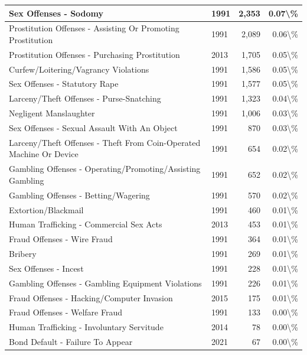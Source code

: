 \documentclass[
]{krantz}
\begin{document}
\begin{longtable}[t]{l|l|r|r}
\hline
Sex Offenses - Sodomy & 1991 & 2,353 & 0.07\textbackslash{}\%\\
\hline
Prostitution Offenses - Assisting Or Promoting Prostitution & 1991 & 2,089 & 0.06\textbackslash{}\%\\
\hline
Prostitution Offenses - Purchasing Prostitution & 2013 & 1,705 & 0.05\textbackslash{}\%\\
\hline
Curfew/Loitering/Vagrancy Violations & 1991 & 1,586 & 0.05\textbackslash{}\%\\
\hline
Sex Offenses - Statutory Rape & 1991 & 1,577 & 0.05\textbackslash{}\%\\
\hline
Larceny/Theft Offenses - Purse-Snatching & 1991 & 1,323 & 0.04\textbackslash{}\%\\
\hline
Negligent Manslaughter & 1991 & 1,006 & 0.03\textbackslash{}\%\\
\hline
Sex Offenses - Sexual Assault With An Object & 1991 & 870 & 0.03\textbackslash{}\%\\
\hline
Larceny/Theft Offenses - Theft From Coin-Operated Machine Or Device & 1991 & 654 & 0.02\textbackslash{}\%\\
\hline
Gambling Offenses - Operating/Promoting/Assisting Gambling & 1991 & 652 & 0.02\textbackslash{}\%\\
\hline
Gambling Offenses - Betting/Wagering & 1991 & 570 & 0.02\textbackslash{}\%\\
\hline
Extortion/Blackmail & 1991 & 460 & 0.01\textbackslash{}\%\\
\hline
Human Trafficking - Commercial Sex Acts & 2013 & 453 & 0.01\textbackslash{}\%\\
\hline
Fraud Offenses - Wire Fraud & 1991 & 364 & 0.01\textbackslash{}\%\\
\hline
Bribery & 1991 & 269 & 0.01\textbackslash{}\%\\
\hline
Sex Offenses - Incest & 1991 & 228 & 0.01\textbackslash{}\%\\
\hline
Gambling Offenses - Gambling Equipment Violations & 1991 & 226 & 0.01\textbackslash{}\%\\
\hline
Fraud Offenses - Hacking/Computer Invasion & 2015 & 175 & 0.01\textbackslash{}\%\\
\hline
Fraud Offenses - Welfare Fraud & 1991 & 133 & 0.00\textbackslash{}\%\\
\hline
Human Trafficking - Involuntary Servitude & 2014 & 78 & 0.00\textbackslash{}\%\\
\hline
Bond Default - Failure To Appear & 2021 & 67 & 0.00\textbackslash{}\%\\

\end{longtable}
\end{document}
